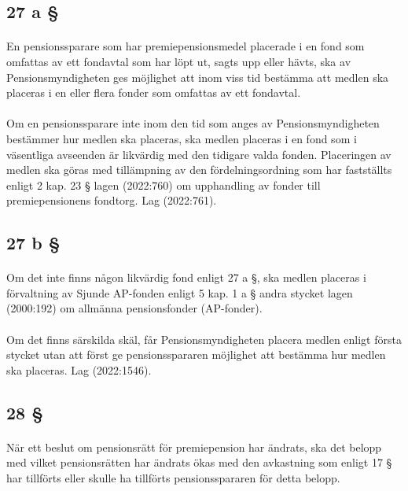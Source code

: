 \documentclass[a4paper,notitlepage,openany,10pt]{book}
\begin{document}
\subsection*{27 a §}
\paragraph*{}
En pensionssparare som har premiepensionsmedel placerade i en fond som omfattas av ett fondavtal som har löpt ut, sagts upp eller hävts, ska av Pensionsmyndigheten ges möjlighet att inom viss tid bestämma att medlen ska placeras i en eller flera fonder som omfattas av ett fondavtal.
\paragraph*{}
Om en pensionssparare inte inom den tid som anges av Pensionsmyndigheten bestämmer hur medlen ska placeras, ska medlen placeras i en fond som i väsentliga avseenden är likvärdig med den tidigare valda fonden. Placeringen av medlen ska göras med tillämpning av den fördelningsordning som har fastställts enligt 2 kap. 23 § lagen (2022:760) om upphandling av fonder till premiepensionens fondtorg.
Lag (2022:761).
\subsection*{27 b §}
\paragraph*{}
Om det inte finns någon likvärdig fond enligt 27 a §, ska medlen placeras i förvaltning av Sjunde AP-fonden enligt 5 kap. 1 a § andra stycket lagen (2000:192) om allmänna pensionsfonder (AP-fonder).
\paragraph*{}
Om det finns särskilda skäl, får Pensionsmyndigheten placera medlen enligt första stycket utan att först ge pensionsspararen möjlighet att bestämma hur medlen ska placeras.
Lag (2022:1546).
\subsection*{28 §}
\paragraph*{}
När ett beslut om pensionsrätt för premiepension har ändrats, ska det belopp med vilket pensionsrätten har ändrats ökas med den avkastning som enligt 17 § har tillförts eller skulle ha tillförts pensionsspararen för detta belopp.
\end{document}
